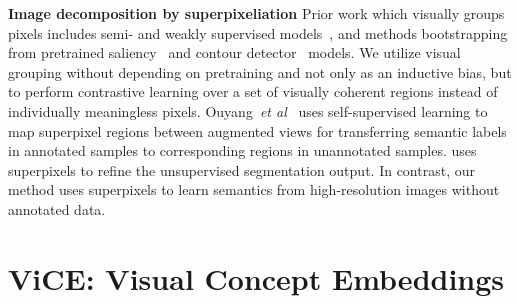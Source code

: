 \documentclass{bmvc2k}
\def\etal{\emph{et al}\bmvaOneDot}
\begin{document}
\noindent
\textbf{Image decomposition by superpixeliation} Prior work which visually groups pixels includes semi- and weakly supervised models~\cite{Franchi2021RobustSS, Yi2022WeaklysupervisedSSGuided, Kwak2017WeaklySSPooling}, and methods bootstrapping from pretrained saliency~\cite{VanGansbeke2021UnsupervisedSS} and contour detector~\cite{Zhang2020UnsupHiearchicalGrouping, Hwang2019SegSort, Ke2022UnsupervisedHS} models. We utilize visual grouping without depending on pretraining and not only as an inductive bias, but to perform contrastive learning over a set of visually coherent regions instead of individually meaningless pixels. Ouyang~\etal~\cite{Ouyang2020SelfSupSuperpixels} uses self-supervised learning to map superpixel regions between augmented views for transferring semantic labels in annotated samples to corresponding regions in unannotated samples. \cite{Kanezaki2018UnsupSegSuperpixels, Mirsadeghi2021InMARS} uses superpixels to refine the unsupervised segmentation output. In contrast, our method uses superpixels to learn semantics from high-resolution images without annotated data.

\section{ViCE: Visual Concept Embeddings}
\label{sec:vice}
\end{document}
